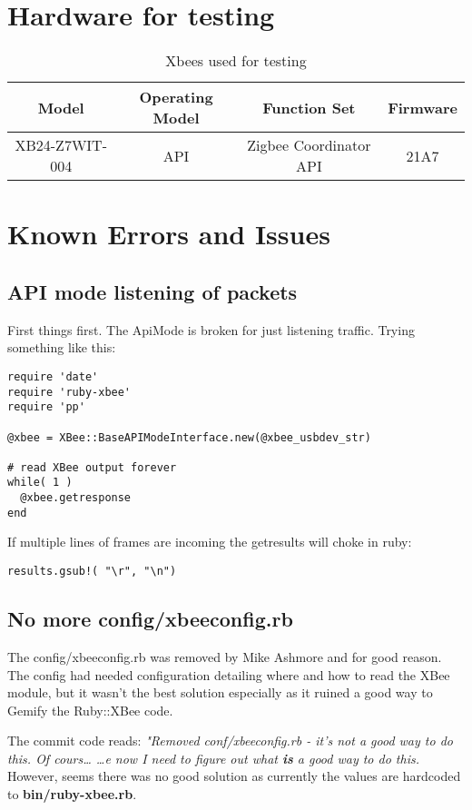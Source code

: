 \setlength{\parindent}{0pt}
\section{Hardware for testing}
\begin{table}[ht]
\caption{Xbees used for testing}
\centering
\begin{tabular}{c c c c}
\hline\hline
Model & Operating Model & Function Set & Firmware \\ [0.5ex] %
\hline
XB24-Z7WIT-004 & API & Zigbee Coordinator API & 21A7 \\ [1ex]
\hline
\end{tabular}
\label{table:nonlin}
\end{table}

\section{Known Errors and Issues}
\subsection{API mode listening of packets}
First things first. The ApiMode is broken for just listening traffic. Trying something like this:
\begin{code}
\begin{lstlisting}
require 'date'
require 'ruby-xbee'
require 'pp'

@xbee = XBee::BaseAPIModeInterface.new(@xbee_usbdev_str)

# read XBee output forever
while( 1 )
  @xbee.getresponse
end
\end{lstlisting}
\end{code}


If multiple lines of frames are incoming the getresults will choke in ruby:
\begin{code}
\begin{lstlisting}
results.gsub!( "\r", "\n")
\end{lstlisting}
\end{code}

\subsection{No more config/xbeeconfig.rb}
The config/xbeeconfig.rb was removed by Mike Ashmore and for good reason. The config had needed configuration detailing where and how to read the XBee module, but it wasn't the best solution especially as it ruined a good way to Gemify the Ruby::XBee code.

\noindent The commit code reads: \textit{"Removed conf/xbeeconfig.rb - it's not a good way to do this. Of cours… …e now I need to figure out what \textbf{is} a good way to do this.} However, seems there was no good solution as currently the values are hardcoded to \textbf{bin/ruby-xbee.rb}.
